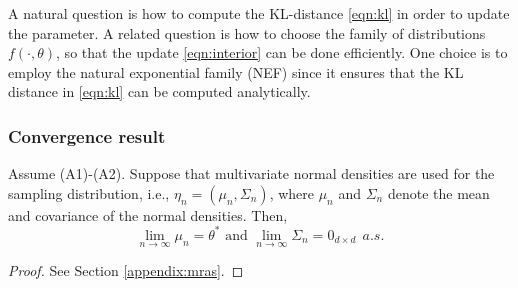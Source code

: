  A natural question is how to compute the KL-distance \eqref{eqn:kl} in order to update the parameter. A related question is how to choose the family of distributions $f(\cdot,\theta)$, so that the update \eqref{eqn:interior} can be done efficiently. One choice is to employ the natural exponential family (NEF) since it ensures that the KL distance in \eqref{eqn:kl} can be computed analytically. %


% 
% 
% 

                    

\subsubsection*{Convergence result}
\begin{theorem}\label{thm:mras}
Assume (A1)-(A2). Suppose that multivariate normal densities are used for the sampling distribution, i.e., $\eta_n = (\mu_n, \Sigma_n)$, where $\mu_n$ and $\Sigma_n$ denote the mean and covariance of the normal densities.
Then, 
\begin{equation}\label{eqn:smain}
\lim_{n\rightarrow \infty}\mu_n=\theta^* \text{ and } \lim_{n\rightarrow \infty}\Sigma_n=0_{d\times d}~~a.s.
\end{equation}
\end{theorem}
\begin{proof}
 See Section \ref{appendix:mras}.
\end{proof}
